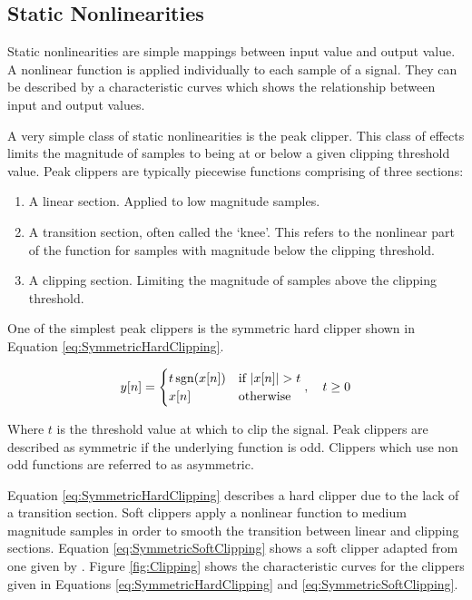 	\subsection{Static Nonlinearities}
	\label{sec:Excitation-Statics}
		Static nonlinearities are simple mappings between input value and output value. A nonlinear function is
		applied individually to each sample of a signal. They can be described by a characteristic curves which
		shows the relationship between input and output values.
		
		A very simple class of static nonlinearities is the peak clipper. This class of effects limits the
		magnitude of samples to being at or below a given clipping threshold value. Peak clippers are typically
		piecewise functions comprising of three sections:

		\begin{enumerate}
			\item A linear section. Applied to low magnitude samples.
			\item A transition section, often called the `knee'. This refers to the nonlinear part of the
				function for samples with magnitude below the clipping threshold.
			\item A clipping section. Limiting the magnitude of samples above the clipping threshold.
		\end{enumerate}

		One of the simplest peak clippers is the symmetric hard clipper shown in Equation
		\ref{eq:SymmetricHardClipping}.

		\begin{equation}
			y[n] = \begin{cases}
				t\operatorname{sgn}(x[n]) & \text{if $|x[n]| > t$} \\
				x[n] & \text{otherwise}
			\end{cases}, \quad t \geq 0
			\label{eq:SymmetricHardClipping}
		\end{equation}

		Where $t$ is the threshold value at which to clip the signal. Peak clippers are described as symmetric if
		the underlying function is odd. Clippers which use non odd functions are referred to as asymmetric.

		Equation \ref{eq:SymmetricHardClipping} describes a hard clipper due to the lack of a transition section.
		Soft clippers apply a nonlinear function to medium magnitude samples in order to smooth the transition
		between linear and clipping sections. Equation \ref{eq:SymmetricSoftClipping} shows a soft clipper adapted
		from one given by \citet{dutilleux2011nonlinear}. Figure \ref{fig:Clipping} shows the characteristic curves
		for the clippers given in Equations \ref{eq:SymmetricHardClipping} and \ref{eq:SymmetricSoftClipping}.

